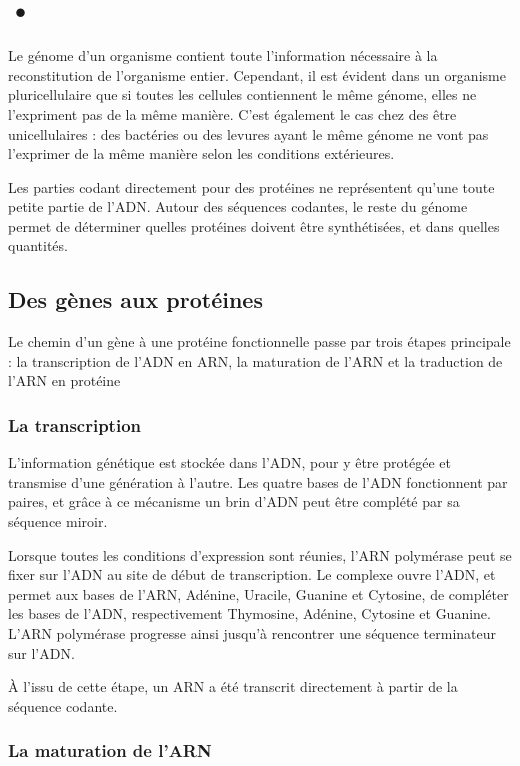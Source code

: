 \documentclass{report}
\begin{document}
\section{•}

Le génome d'un organisme contient toute l'information nécessaire à la reconstitution de l'organisme entier. Cependant, il est évident dans un organisme pluricellulaire que si toutes les cellules contiennent le même génome, elles ne l'expriment pas de la même manière. C'est également le cas chez des être unicellulaires : des bactéries ou des levures ayant le même génome ne vont pas l'exprimer de la même manière selon les conditions extérieures. 

Les parties codant directement pour des protéines ne représentent qu'une toute petite partie de l'ADN. Autour des séquences codantes, le reste du génome permet de déterminer quelles protéines doivent être synthétisées, et dans quelles quantités. 

\subsection{Des gènes aux protéines}

Le chemin d'un gène à une protéine fonctionnelle passe par trois étapes principale : la transcription de l'ADN en ARN, la maturation de l'ARN et la traduction de l'ARN en protéine 

\subsubsection{La transcription}

L'information génétique est stockée dans l'ADN, pour y être protégée et transmise d'une génération à l'autre. Les quatre bases de l'ADN fonctionnent par paires, et grâce à ce mécanisme un brin d'ADN peut être complété par sa séquence miroir. 

Lorsque toutes les conditions d'expression sont réunies, l'ARN polymérase peut se fixer sur l'ADN au site de début de transcription. Le complexe ouvre l'ADN, et permet aux bases de l'ARN, Adénine, Uracile, Guanine et Cytosine, de compléter les bases de l'ADN, respectivement Thymosine, Adénine, Cytosine et Guanine. L'ARN polymérase progresse ainsi jusqu'à rencontrer une séquence terminateur sur l'ADN. 

À l'issu de cette étape, un ARN a été transcrit directement à partir de la séquence codante. 

\subsubsection{La maturation de l'ARN}
\end{document}
